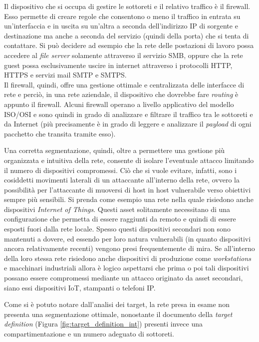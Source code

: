 \documentclass[target=bach,aauheader=]{thud}
\begin{document}
Il dispositivo che si occupa di gestire le sottoreti e il relativo traffico è il firewall. Esso permette di creare regole che consentono o meno il traffico in entrata su un'interfaccia e in uscita su un'altra a seconda dell'indirizzo IP di sorgente e destinazione ma anche a seconda del servizio (quindi della porta) che si tenta di contattare. Si può decidere ad esempio che la rete delle postazioni di lavoro possa accedere al \textit{file server} solamente attraverso il servizio SMB, oppure che la rete guest possa esclusivamente uscire in internet attraverso i protocolli HTTP, HTTPS e servizi mail SMTP e SMTPS.
\\ Il firewall, quindi, offre una gestione ottimale e centralizzata delle interfacce di rete e perciò, in una rete aziendale, il dispositivo che dovrebbe fare \textit{routing} è appunto il firewall. Alcuni firewall operano a livello applicativo del modello ISO/OSI e sono quindi in grado di analizzare e filtrare il traffico tra le sottoreti e da Internet (più precisamente è in grado di leggere e analizzare il \textit{payload} di ogni pacchetto che transita tramite esso).

Una corretta segmentazione, quindi, oltre a permettere una gestione più organizzata e intuitiva della rete, consente di isolare l'eventuale attacco limitando il numero di dispositivi compromessi. Ciò che si vuole evitare, infatti, sono i cosiddetti movimenti laterali di un attaccante all'interno della rete, ovvero la possibilità per l'attaccante di muoversi di host in host vulnerabile verso obiettivi sempre più sensibili. Si prenda come esempio una rete nella quale risiedono anche dispositivi \textit{Internet of Things}. Questi asset solitamente necessitano di una configurazione che permetta di essere raggiunti da remoto e quindi di essere esposti fuori dalla rete locale. Spesso questi dispositivi secondari non sono mantenuti a dovere, ed essendo per loro natura vulnerabili (in quanto dispositivi ancora relativamente recenti) vengono presi frequentemente di mira. Se all'interno della loro stessa rete risiedono anche dispositivi di produzione come \textit{workstations} e macchinari industriali allora è logico aspettarsi che prima o poi tali dispositivi possano essere compromessi mediante un attacco originato da asset secondari, siano essi dispositivi IoT, stampanti o telefoni IP.

Come si è potuto notare dall'analisi dei target, la rete presa in esame non presenta una segmentazione ottimale, nonostante il documento della \textit{target definition} (Figura \ref{fig:target_definition_int}) presenti invece una compartimentazione e un numero adeguato di sottoreti.
\end{document}
